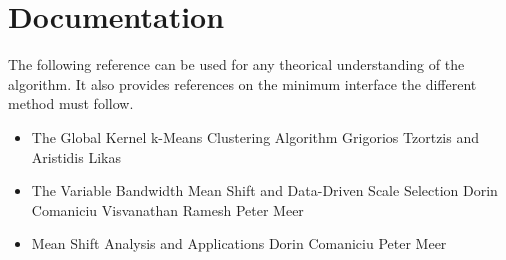 \section{Documentation}
The following reference can be used for any theorical understanding of the algorithm. It also provides references on the minimum interface the different method must follow.

\begin{itemize}
\item The Global Kernel k-Means Clustering Algorithm
Grigorios Tzortzis and Aristidis Likas
\item The Variable Bandwidth Mean Shift and Data-Driven Scale Selection
Dorin Comaniciu
Visvanathan Ramesh 
Peter Meer
\item Mean Shift Analysis and Applications
Dorin Comaniciu
Peter Meer

\end{itemize}
